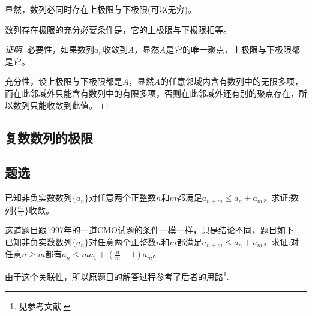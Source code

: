 显然，数列必同时存在上极限与下极限(可以无穷)。

\begin{theorem}
数列存在极限的充分必要条件是，它的上极限与下极限相等。  
\end{theorem}

\begin{proof}[证明]
  必要性，如果数列$a_n$收敛到$A$，显然$A$是它的唯一聚点，上极限与下极限都是它。

  充分性，设上极限与下极限都是$A$，显然$A$的任意邻域内含有数列中的无限多项，而在此邻域外只能含有数列中的有限多项，否则在此邻域外还有别的聚点存在，所以数列只能收敛到此值。
\end{proof}



\subsection{复数数列的极限}
\label{sec:limit-of-complex-number-sequence}

\subsection{题选}
\label{sec:exercises-for-number-sequence-limit}


\begin{exercise}
  已知非负实数数列$\{a_n\}$对任意两个正整数$n$和$m$都满足$a_{n+m} \leqslant a_n+a_m$，求证:数列$\{\frac{a_n}{n}\}$收敛。
\end{exercise}

\exerciseFrom[\url{http://kuing.orzweb.net/viewthread.php?tid=4633}]

\exerciseSolvedDate[2017-05-24]

这道题目跟1997年的一道CMO试题的条件一模一样，只是结论不同，题目如下: 已知非负实数数列$\{a_n\}$对任意两个正整数$n$和$m$都满足$a_{n+m} \leqslant a_n+a_m$，求证:对任意$n \geqslant m$都有$a_n \leqslant ma_1+\left( \frac{n}{m}-1\right)a_m$。

由于这个关联性，所以原题目的解答过程参考了后者的思路\footnote{见参考文献\cite{olympic-math}.}.

